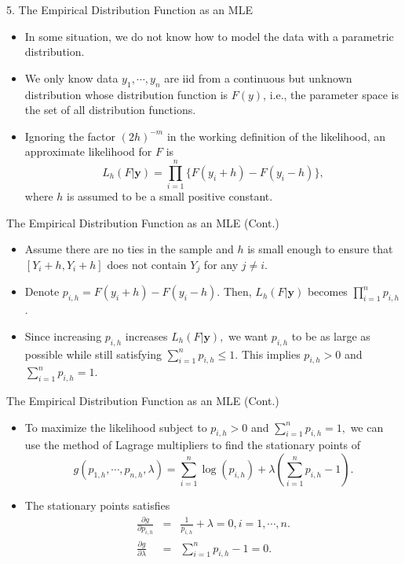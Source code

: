 \documentclass{beamer}
\begin{document}
 \begin{frame}{5. The Empirical Distribution Function as an MLE}
        \begin{itemize}
            \item In some situation, we do not know how to model the data with a parametric distribution. 
            \item We only know data $y_{1}, \cdots, y_{n}$ are iid from a continuous but unknown distribution whose distribution function is $F(y)$, i.e., the parameter space is the set of all distribution functions.
            \item Ignoring the factor $(2h)^{-m}$ in the working definition of the likelihood, an approximate likelihood for $F$ is
            $$L_{h}(F|\boldsymbol{y}) = \prod^{n}_{i=1}\{F(y_{i} + h) - F(y_{i} - h)\},$$
            where $h$ is assumed to be a small positive constant.
        \end{itemize}
    \end{frame}

    \begin{frame}{The Empirical Distribution Function as an MLE (Cont.)}
        \begin{itemize}
            \item Assume there are no ties in the sample and $h$ is small enough to ensure that $[Y_{i} + h, Y_{i} + h]$ does not contain $Y_{j}$ for any $j \neq i$.
            \item Denote $p_{i, h} = F(y_{i} + h) - F(y_{i} - h)$. Then, $L_{h}(F|\boldsymbol{y})$ becomes $\prod^{n}_{i=1} p_{i, h}$.
            \item Since increasing $p_{i,h}$ increases $L_{h}(F|\boldsymbol{y}),$ we want $p_{i,h}$ to be as large as possible while still satisfying $\sum^{n}_{i=1} p_{i,h} \leq 1.$ This implies $p_{i,h} > 0$ and $\sum^{n}_{i=1} p_{i,h} = 1.$
        \end{itemize}
    \end{frame}


    \begin{frame}{The Empirical Distribution Function as an MLE (Cont.)}
        \begin{itemize}
            \item To maximize the likelihood subject to $p_{i,h} > 0$ and $\sum^{n}_{i=1} p_{i,h} = 1,$ we can use the method of Lagrage multipliers to find the stationary points of 
            $$g(p_{1,h}, \cdots, p_{n,h}, \lambda) = \sum^{n}_{i=1}\log(p_{i,h}) + \lambda (\sum^{n}_{i=1}p_{i,h}-1).$$
            \item The stationary points satisfies
            \begin{eqnarray}
                \frac{\partial g}{\partial p_{i,h}}    & = & \frac{1}{p_{i,h}} + \lambda = 0, i = 1, \cdots, n. \nonumber \\
                \frac{\partial g}{\partial \lambda} & = & \sum^{n}_{i=1} p_{i,h} - 1 = 0. \nonumber
            \end{eqnarray}
        \end{itemize}
    \end{frame}
    
\end{document}

